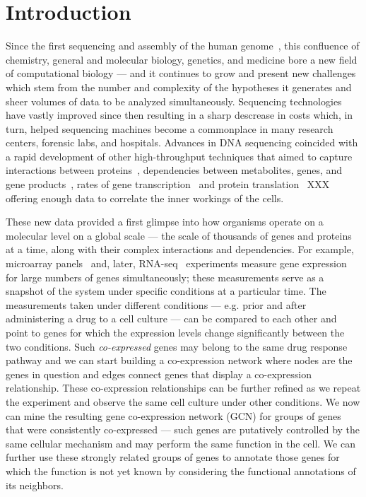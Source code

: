 \chapter{Introduction}


Since the first sequencing and assembly of the human genome~\cite{FirstHumanGenome}, this confluence of chemistry, general and molecular biology, genetics, and medicine bore a new field of computational biology --- and it continues to grow and present new challenges which stem from the number and complexity of the hypotheses it generates and sheer volumes of data to be analyzed simultaneously. Sequencing technologies have vastly improved since then resulting in a sharp descrease in costs which, in turn, helped sequencing machines become a commonplace in many research centers, forensic labs, and hospitals. Advances in DNA sequencing coincided with a rapid development of other high-throughput techniques that aimed to capture interactions between proteins~\cite{yeast2hybrid,TAPMS}, dependencies between metabolites, genes, and gene products~\cite{ChipSeq,GeneKnockouts}, rates of gene transcription~\cite{RNAseq} and protein translation~\cite{riboseq} XXX offering enough data to correlate the inner workings of the cells.


These new data provided a first glimpse into how organisms operate on a molecular level on a global scale --- the scale of thousands of genes and proteins at a time, along with their complex interactions and dependencies. For example, microarray panels~\cite{microarray} and, later, RNA-seq~\cite{RNAseq} experiments measure gene expression for large numbers of genes simultaneously; these measurements serve as a snapshot of the system under specific conditions at a particular time. The measurements taken under different conditions --- e.g. prior and after administering a drug to a cell culture --- can be compared to each other and point to genes for which the expression levels change significantly between the two conditions. Such \textit{co-expressed} genes may belong to the same drug response pathway and we can start building a co-expression network where nodes are the genes in question and edges connect genes that display a co-expression relationship. These co-expression relationships can be further refined as we repeat the experiment and observe the same cell culture under other conditions. We now can mine the resulting gene co-expression network (GCN) for groups of genes that were consistently co-expressed --- such genes are putatively controlled by the same cellular mechanism and may perform the same function in the cell. We can further use these strongly related groups of genes to annotate those genes for which the function is not yet known by considering the functional annotations of its neighbors.

